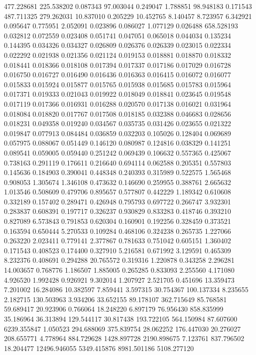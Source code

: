 477.228681
225.538202
0.087343
97.003044
0.249047
1.788851
98.948183
0.171543
487.711325
279.262031
10.837010
0.205229
10.452765
8.140457
8.723957
6.342921
0.095647
0.775951
2.052091
0.023896
0.086027
1.077129
0.026488
658.528193
0.032812
0.072559
0.023408
0.051741
0.047051
0.065018
0.044034
0.135234
0.144395
0.034326
0.034327
0.026809
0.026376
0.026339
0.023015
0.022334
0.022292
0.021938
0.021356
0.021124
0.019153
0.018881
0.018870
0.018332
0.018441
0.018366
0.018108
0.017394
0.017337
0.017186
0.017029
0.016728
0.016750
0.016727
0.016490
0.016436
0.016363
0.016415
0.016072
0.016077
0.015833
0.015924
0.015877
0.015765
0.015938
0.015685
0.015783
0.015964
0.017371
0.019333
0.021043
0.019922
0.018049
0.018841
0.023645
0.019548
0.017119
0.017366
0.016931
0.016288
0.020570
0.017138
0.016021
0.031964
0.018084
0.018820
0.017767
0.017508
0.018185
0.032388
0.046683
0.028656
0.018231
0.049358
0.019240
0.034567
0.035735
0.031426
0.023655
0.021322
0.019847
0.077913
0.084484
0.036859
0.032203
0.105026
0.128404
0.069689
0.057975
0.088067
0.051449
0.146120
0.080987
0.124816
0.038329
0.141251
0.089541
0.059005
0.059440
0.251242
0.069439
0.106632
0.557365
0.425067
0.738163
0.291119
0.176611
0.216640
0.694114
0.062588
0.205351
0.557803
0.145636
0.184903
0.390041
0.448348
0.240393
0.315989
0.522575
1.565468
0.908053
1.305674
1.346108
0.473632
0.146690
0.259955
0.388761
2.665632
1.013546
0.508609
0.479706
0.895657
0.577807
0.442229
1.189342
0.610608
0.332189
0.157402
0.289471
0.426948
0.795793
0.697722
0.266747
3.932301
0.283837
0.608391
0.197717
0.326237
0.930829
0.833283
0.418746
0.393210
0.827089
6.573843
0.791853
0.620304
0.160901
0.192256
0.328459
0.373521
0.163594
0.650444
5.270533
0.109284
0.468106
0.324238
0.265735
1.227066
0.263220
2.023411
0.779141
2.377867
0.781633
0.751042
0.605151
1.360402
0.171543
0.408523
0.174400
0.327910
5.216581
0.671992
3.129591
0.465309
8.232376
0.408691
0.294288
20.765572
0.319316
1.220878
0.343258
2.296281
14.003657
0.768776
1.186507
1.885005
0.265285
0.833093
2.255560
4.171080
4.926520
1.992428
0.926921
9.302014
1.207927
2.521705
0.451696
13.359473
7.201002
16.284086
10.382597
7.859441
3.597315
30.754367
100.137334
8.235655
2.182715
130.503963
3.934206
33.652155
89.178107
362.715649
85.768581
59.689417
20.923906
0.766064
18.248220
6.897179
76.956430
858.835999
35.186964
36.313894
129.544117
30.817438
193.722105
564.150984
87.607600
6239.355847
1.050523
294.688069
375.839754
28.062252
176.447030
20.276027
208.655771
4.778964
884.729628
1428.897728
2190.898675
7.123761
837.796502
18.204477
12496.946055
5349.415876
8981.501186
5108.277120

